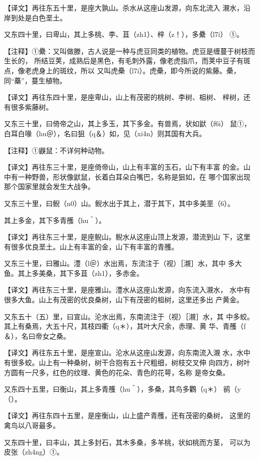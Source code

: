 \documentclass[a4paper,12pt,UTF8,twoside]{ctexbook}
\begin{document}
【译文】再往东五十里，是座大孰山。杀水从这座山发源，向东北流入 瀙水，沿岸到处是白色垩土。

又东四十里，曰卑山，其上多桃、李、苴（zh1）、梓（z！），多纍（l7i） ①。

【注释】①纍：又叫做滕，古人说是一种与虎豆同类的植物。虎豆是缠蔓于树枝而生长的， 所结豆荚，成熟后是黑色，有毛刺外露，像老虎指爪，而荚中豆子有斑点，像老虎身上的斑纹，所以 又叫虎櫐（l7i）。虎櫐，即今所说的紫藤。櫐，同“蘽”，蔓生植物。

【译文】再往东四十里，是座卑山，山上有茂密的桃树、李树、柤树、 梓树，还有很多紫藤树。

又东三十里，曰倚帝之山，其上多玉，其下多金。有兽焉，状如鼣（f6i） 鼠①，白耳白喙（hu＠），名曰狙（q＆）如，见（xi4n）则其国有大兵。

【注释】①鼳鼠：不详何种动物。

【译文】再往东三十里，是座倚帝山，山上有丰富的玉石，山下有丰富 的金。山中有一种野兽，形状像鼣鼠，长着白耳朵白嘴巴，名称是狙如，在 哪个国家出现那个国家里就会发生大战争。

又东三十里，曰鲵（n0）山。鲵水出于其上，潜于其下，其中多美垩（6）。

其上多金，其下多青雘（hu＾）。

【译文】再往东三十里，是座鲵山。鲵水从这座山顶上发源，潜流到山 下，这里有很多优良垩土。山上有丰富的金，山下有丰富的青雘。

又东三十里，曰雅山。澧（l＠）水出焉，东流注于（视）［瀙］水，其中 多大鱼。其上多美桑，其下多苴（zh1），多赤金。

【译文】再往东三十里，是座雅山。澧水从这座山发源，向东流入瀙水， 水中有很多大鱼。山上有茂密的优良桑树，山下有茂密的柤树，这里还多出 产黄金。

又东五十（五）里，曰宣山。沦水出焉，东南流注于（视）［瀙］水，其 中多蛟。其上有桑焉，大五十尺，其枝四衢（q＊），其叶大尺余，赤理、黄 华、青雘（f＆），名曰帝女之桑。

【译文】再往东五十里，是座宣山。沦水从这座山发源，向东南流入瀙 水，水中有很多蛟。山上有一种桑树，树干合抱有五十尺粗细，树枝交叉伸 向四方，树叶方圆有一尺多，红色的纹理、黄色的花朵、青色的花萼，名称 是帝女桑。

又东四十五里，曰衡山，其上多青雘（hu＾），多桑，其鸟多鸜（q＊） 鹆（y（）。

【译文】再往东四十五里，是座衡山，山上盛产青雘，还有茂密的桑树， 这里的禽鸟以八哥最多。

又东四十里，曰丰山，其上多封石，其木多桑，多羊桃，状如桃而方茎， 可以为皮张（zh4ng）①。
\end{document}
